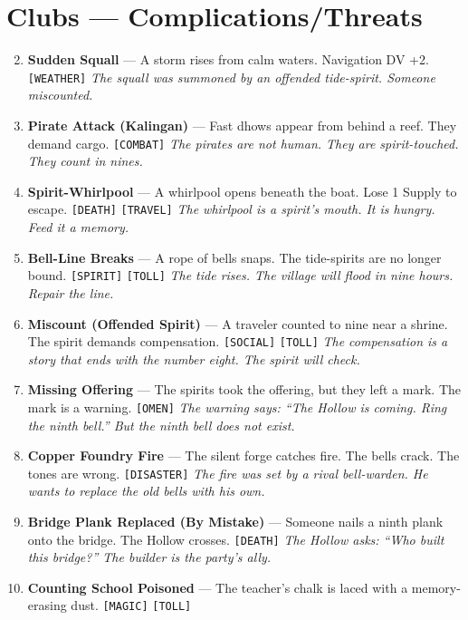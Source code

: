 \section*{Clubs --- Complications/Threats}
\label{sec:aelinnel-complications}
\begin{enumerate}
\setcounter{enumi}{1}
\item \textbf{Sudden Squall} --- A storm rises from calm waters. Navigation DV +2. \texttt{[WEATHER]}
  \hfill \textit{The squall was summoned by an offended tide-spirit. Someone miscounted.}
\item \textbf{Pirate Attack (Kalingan)} --- Fast dhows appear from behind a reef. They demand cargo. \texttt{[COMBAT]}
  \hfill \textit{The pirates are not human. They are spirit-touched. They count in nines.}
\item \textbf{Spirit-Whirlpool} --- A whirlpool opens beneath the boat. Lose 1 Supply to escape. \texttt{[DEATH]} \texttt{[TRAVEL]}
  \hfill \textit{The whirlpool is a spirit's mouth. It is hungry. Feed it a memory.}
\item \textbf{Bell-Line Breaks} --- A rope of bells snaps. The tide-spirits are no longer bound. \texttt{[SPIRIT]} \texttt{[TOLL]}
  \hfill \textit{The tide rises. The village will flood in nine hours. Repair the line.}
\item \textbf{Miscount (Offended Spirit)} --- A traveler counted to nine near a shrine. The spirit demands compensation. \texttt{[SOCIAL]} \texttt{[TOLL]}
  \hfill \textit{The compensation is a story that ends with the number eight. The spirit will check.}
\item \textbf{Missing Offering} --- The spirits took the offering, but they left a mark. The mark is a warning. \texttt{[OMEN]}
  \hfill \textit{The warning says: ``The Hollow is coming. Ring the ninth bell.'' But the ninth bell does not exist.}
\item \textbf{Copper Foundry Fire} --- The silent forge catches fire. The bells crack. The tones are wrong. \texttt{[DISASTER]}
  \hfill \textit{The fire was set by a rival bell-warden. He wants to replace the old bells with his own.}
\item \textbf{Bridge Plank Replaced (By Mistake)} --- Someone nails a ninth plank onto the bridge. The Hollow crosses. \texttt{[DEATH]}
  \hfill \textit{The Hollow asks: ``Who built this bridge?'' The builder is the party's ally.}
\item \textbf{Counting School Poisoned} --- The teacher's chalk is laced with a memory-erasing dust. \texttt{[MAGIC]} \texttt{[TOLL]}

\end{enumerate}
